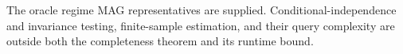 The oracle regime MAG representatives are supplied.  Conditional-independence and invariance testing, finite-sample estimation, and their query complexity are outside both the completeness theorem and its runtime bound.